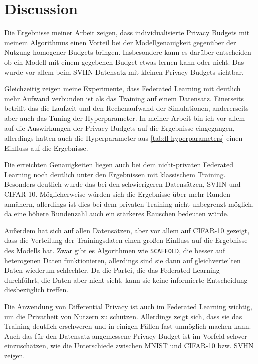 \chapter{Discussion}


Die Ergebnisse meiner Arbeit zeigen, dass individualisierte Privacy Budgets mit meinem Algorithmus einen Vorteil bei der Modellgenauigkeit gegenüber der Nutzung homogener Budgets bringen. Insbesondere kann es darüber entscheiden ob ein Modell mit einem gegebenen Budget etwas lernen kann oder nicht. Das wurde vor allem beim SVHN Datensatz mit kleinen Privacy Budgets sichtbar.

Gleichzeitig zeigen meine Experimente, dass Federated Learning mit deutlich mehr Aufwand verbunden ist als das Training auf einem Datensatz. Einerseits betrifft das die Laufzeit und den Rechenaufwand der Simulationen, andererseits aber auch das Tuning der Hyperparameter. In meiner Arbeit bin ich vor allem auf die Auswirkungen der Privacy Budgets auf die Ergebnisse eingegangen, allerdings hatten auch die Hyperparameter aus \autoref{tab:fl-hyperparameters} einen Einfluss auf die Ergebnisse.

Die erreichten Genauigkeiten liegen auch bei dem nicht-privaten Federated Learning noch deutlich unter den Ergebnissen mit klassischem Training. Besonders deutlich wurde das bei den schwierigeren Datensätzen, SVHN und CIFAR-10. Möglicherweise würden sich die Ergebnisse über mehr Runden annähern, allerdings ist dies bei dem privaten Training nicht unbegrenzt möglich, da eine höhere Rundenzahl auch ein stärkeres Rauschen bedeuten würde.

Außerdem hat sich auf allen Datensätzen, aber vor allem auf CIFAR-10 gezeigt, dass die Verteilung der Trainingsdaten einen großen Einfluss auf die Ergebnisse des Modells hat. Zwar gibt es Algorithmen wie \texttt{SCAFFOLD}, die besser auf heterogenen Daten funktionieren, allerdings sind sie dann auf gleichverteilten Daten wiederum schlechter. Da die Partei, die das Federated Learning durchführt, die Daten aber nicht sieht, kann sie keine informierte Entscheidung diesbezüglich treffen.

Die Anwendung von Differential Privacy ist auch im Federated Learning wichtig, um die Privatheit von Nutzern zu schützen. Allerdings zeigt sich, dass sie das Training deutlich erschweren und in einigen Fällen fast unmöglich machen kann. Auch das für den Datensatz angemessene Privacy Budget ist im Vorfeld schwer einzuschätzen, wie die Unterschiede zwischen MNIST und CIFAR-10 bzw. SVHN zeigen.

